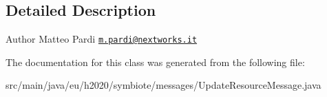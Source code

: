 \subsection{Detailed Description}
\begin{DoxyAuthor}{Author}
Matteo Pardi \href{mailto:m.pardi@nextworks.it}{\tt m.\+pardi@nextworks.\+it} 
\end{DoxyAuthor}


The documentation for this class was generated from the following file\+:\begin{DoxyCompactItemize}
\item 
src/main/java/eu/h2020/symbiote/messages/Update\+Resource\+Message.\+java\end{DoxyCompactItemize}
